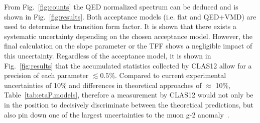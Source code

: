 \documentclass[epj]{webofc}
\begin{document}
	\FloatBarrier
From Fig.~\ref{fig:counts} the QED normalized spectrum can be deduced and is shown in Fig.~\ref{fig:results}. Both acceptance models (i.e. flat and QED+VMD) are used to determine the transition form factor. It is shown that there exists a systematic uncertainty depending on the chosen acceptance model. However, the final calculation on the slope parameter or the TFF shows a negligible impact of this uncertainty. Regardless of the acceptance model, it is shown in Fig.~\ref{fig:results} that the accumulated statistics collected by CLAS12 allow for a precision of each parameter $\lesssim 0.5\%$. Compared to current experimental uncertainties of 10\% and differences in theoretical approaches of $\approx$ 10\%, Table~\ref{tab:etaP.models}, therefore a measurement by CLAS12 would not only be in the position to decisively discriminate between the theoretical predictions, but also pin down one of the largest uncertainties to the muon g-2 anomaly~\cite{gminus2}.
\end{document}
